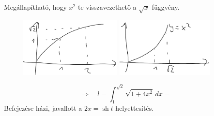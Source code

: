 \documentclass[a4paper,11.5pt]{article}
\DeclareMathOperator{\sh}{sh}
\begin{document}
	\begin{note}
		Megállapítható, hogy $x^2$-te visszavezethető a $\sqrt{x}$ függvény.
		
		\begin{figure}[H]
			\centering
			\includegraphics[height=3cm]{kepek/13.png}
			\includegraphics[height=3cm]{kepek/14.png}
			\caption{}
		\end{figure}
		\[ \Rightarrow\quad l=\int_1^{\sqrt{2}}\sqrt{1+4x^2}\,dx= \]
		Befejezése házi, javallott a $2x=\sh t$ helyettesítés.
	\end{note}
\end{document}
